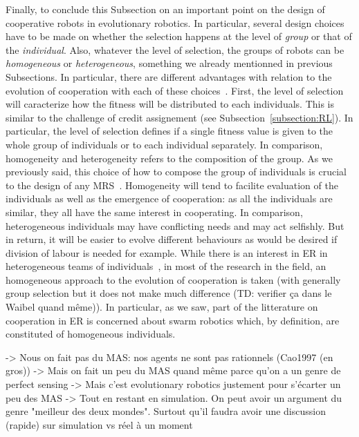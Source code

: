     Finally, to conclude this Subsection on an important point on the design of cooperative robots in evolutionary robotics. In particular, several design choices have to be made on whether the selection happens at the level of \emph{group} or that of the \emph{individual}. Also, whatever the level of selection, the groups of robots can be \emph{homogeneous} or \emph{heterogeneous}, something we already mentionned in previous Subsections. In particular, there are different advantages with relation to the evolution of cooperation with each of these choices~\cite{Waibel2009}. First, the level of selection will caracterize how the fitness will be distributed to each individuals. This is similar to the challenge of credit assignement (see Subsection~\ref{subsection:RL}). In particular, the level of selection defines if a single fitness value is given to the whole group of individuals or to each individual separately. In comparison, homogeneity and heterogeneity refers to the composition of the group. As we previously said, this choice of how to compose the group of individuals is crucial to the design of any MRS~\cite{Quinn2003}. Homogeneity will tend to facilite evaluation of the individuals as well as the emergence of cooperation: as all the individuals are similar, they all have the same interest in cooperating. In comparison, heterogeneous individuals may have conflicting needs and may act selfishly. But in return, it will be easier to evolve different behaviours as would be desired if division of labour is needed for example. While there is an interest in ER in heterogeneous teams of individuals~\cite{Lichocki2013}, in most of the research in the field, an homogeneous approach to the evolution of cooperation is taken (with generally group selection but it does not make much difference (TD: verifier ça dans le Waibel quand même)). In particular, as we saw, part of the litterature on cooperation in ER is concerned about swarm robotics which, by definition, are constituted of homogeneous individuals.


    -> Nous on fait pas du MAS: nos agents ne sont pas rationnels (Cao1997 (en gros))
          -> Mais on fait un peu du MAS quand même parce qu'on a un genre de perfect sensing
          -> Mais c'est evolutionary robotics justement pour s'écarter un peu des MAS
          -> Tout en restant en simulation. On peut avoir un argument du genre "meilleur des deux mondes". Surtout qu'il faudra avoir une discussion (rapide) sur simulation vs réel à un moment

